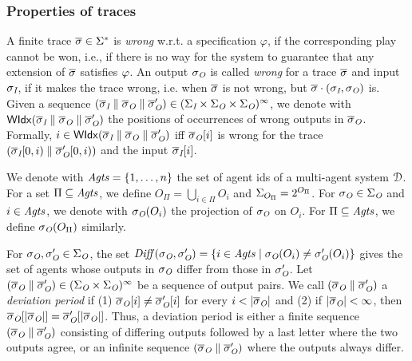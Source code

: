 \subsubsection{Properties of traces}
A finite trace $\overline\sigma
\in \Sigma^*$ is \emph{wrong} w.r.t. a specification $\varphi$, if the corresponding play cannot be won,
i.e., if there is no way for the system to guarantee that any
extension of $\overline\sigma$ satisfies $\varphi$.
An output $\sigma_{\textit{O}}$
is called \emph{wrong} for a trace $\overline\sigma$ and input $\sigma_{\textit{I}}$, if it makes the trace wrong, i.e. when $\overline\sigma$ is not wrong, but $\overline\sigma \cdot (\sigma_{\textit{I}},\sigma_{\textit{O}})$ is. Given a sequence $(\overline\sigma_{\textit{I}}\parallel\overline\sigma_{\textit{O}}\parallel\overline\sigma_{\textit{O}}') \in (\Sigma_{\textit{I}}\times\Sigma_{\textit{O}}\times\Sigma_{\textit{O}})^\infty$, we denote with $\mathsf{WIdx}(\overline\sigma_{\textit{I}}\parallel\overline\sigma_{\textit{O}}\parallel\overline\sigma_{\textit{O}}')$ the positions of occurrences of wrong outputs in $\overline\sigma_{\textit{O}}$. Formally, $i \in \mathsf{WIdx}(\overline\sigma_{\textit{I}}\parallel\overline\sigma_{\textit{O}}\parallel\overline\sigma_{\textit{O}}')$ iff  $\overline\sigma_{\textit{O}}[i]$ is wrong for the trace
$(\overline\sigma_{\textit{I}}[0,i)\parallel\overline\sigma_{\textit{O}}'[0,i))$ and the input $\overline\sigma_{\textit{I}}[i]$.

%
We denote with $\mathit{Agts} = \{1,\ldots,n\}$ the set of agent ids of a multi-agent system $\mathcal{D}$.
%
For a set $\Pi \subseteq \mathit{Agts}$, we define $O_{\Pi} = \bigcup_{i \in \Pi} O_i$ and $\Sigma_{O_{\Pi}} = 2^{O_{\Pi}}$. For $\sigma_{\textit{O}} \in \Sigma_{\textit{O}}$ and $i \in \mathit{Agts}$, we denote with $\sigma_{\textit{O}}(O_i)$ the projection of $\sigma_{\textit{O}}$ on $O_i$. For $\Pi \subseteq \mathit{Agts}$, we define $\sigma_{\textit{O}}(O_{\Pi})$ similarly. 

For  $\sigma_{\textit{O}},  \sigma_{\textit{O}}' \in \Sigma_{\textit{O}}$, the set $\mathit{Diff}(\sigma_{\textit{O}},\sigma_{\textit{O}}') = \{i \in \mathit{Agts} \mid \sigma_{\textit{O}}(O_i) \neq \sigma_{\textit{O}}'(O_i)\}$ gives the set of agents whose outputs in $\sigma_{\textit{O}}$ differ from those in $\sigma_{\textit{O}}'$.
Let $(\overline\sigma_{\textit{O}} \parallel \overline\sigma_{\textit{O}}')\in (\Sigma_{\textit{O}}\times\Sigma_{\textit{O}})^\infty$ be a sequence of output pairs.
We call $(\overline\sigma_{\textit{O}} \parallel\overline\sigma_{\textit{O}}')$ a \emph{deviation period} if (1) $\overline\sigma_{\textit{O}}[i] \neq \overline\sigma_{\textit{O}}'[i ]$ for every $i < |\overline\sigma_{\textit{O}}|$  and (2) if $|\overline\sigma_{\textit{O}}| < \infty$, then $\overline\sigma_{\textit{O}}[|\overline\sigma_{\textit{O}}|] = \overline\sigma_{\textit{O}}'[|\overline\sigma_{\textit{O}}|]$.
Thus, a deviation period is either a finite sequence $(\overline\sigma_{\textit{O}}\parallel\overline\sigma_{\textit{O}}')$  consisting of differing outputs followed by a last letter where the two outputs agree, or an infinite sequence $(\overline\sigma_{\textit{O}}\parallel\overline\sigma_{\textit{O}}')$ where the outputs always differ. 




